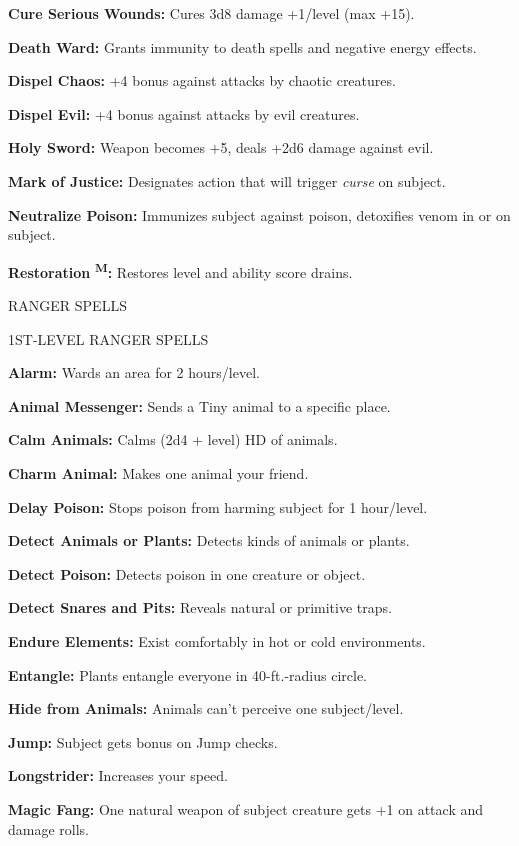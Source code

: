 \documentclass{article}
\begin{document}
\textbf{Cure Serious Wounds:} Cures 3d8 damage +1/level (max +15).

\textbf{Death Ward:} Grants immunity to death spells and negative energy effects.

\textbf{Dispel Chaos:} +4 bonus against attacks by chaotic creatures.

\textbf{Dispel Evil:} +4 bonus against attacks by evil creatures.

\textbf{Holy Sword:} Weapon becomes +5, deals +2d6 damage against evil.

\textbf{Mark of Justice:} Designates action that will trigger \textit{curse }on 
subject.

\textbf{Neutralize Poison:} Immunizes subject against poison, detoxifies venom 
in or on subject.

\textbf{Restoration }\textsuperscript{\textbf{M}}\textbf{:} Restores level and 
ability score drains.

\vspace{12pt}
{\LARGE{}RANGER SPELLS}

1ST-LEVEL RANGER SPELLS

\textbf{Alarm:} Wards an area for 2 hours/level.

\textbf{Animal Messenger:} Sends a Tiny animal to a specific place.

\textbf{Calm Animals:} Calms (2d4 + level) HD of animals.

\textbf{Charm Animal:} Makes one animal your friend.

\textbf{Delay Poison:} Stops poison from harming subject for 1 hour/level.

\textbf{Detect Animals or Plants:} Detects kinds of animals or plants.

\textbf{Detect Poison:} Detects poison in one creature or object.

\textbf{Detect Snares and Pits:} Reveals natural or primitive traps.

\textbf{Endure Elements:} Exist comfortably in hot or cold environments.

\textbf{Entangle:} Plants entangle everyone in 40-ft.-radius circle.

\textbf{Hide from Animals:} Animals can't perceive one subject/level.

\textbf{Jump:} Subject gets bonus on Jump checks.

\textbf{Longstrider:} Increases your speed.

\textbf{Magic Fang:} One natural weapon of subject creature gets +1 on attack and 
damage rolls.
\end{document}
